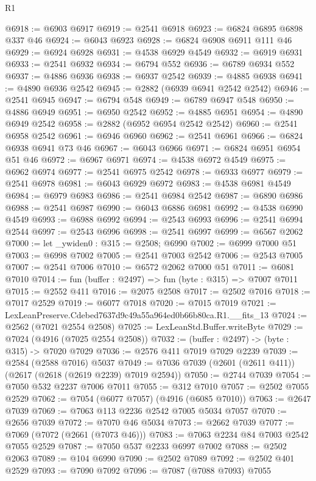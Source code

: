 \begin{lexlean}{R1}
\begin{coremodule}
@6918 := @6903 @6917
@6919 := @2541 @6918
@6923 := @6824 @6895 @6898 @337 @46
@6924 := @6043 @6923
@6928 := @6824 @6908 @6911 @111 @46
@6929 := @6924 @6928
@6931 := @4538 @6929 @4549
@6932 := @6919 @6931
@6933 := @2541 @6932
@6934 := @6794 @552
@6936 := @6789 @6934 @552
@6937 := @4886 @6936
@6938 := @6937 @2542
@6939 := @4885 @6938
@6941 := @4890 @6936 @2542
@6945 := @2882 (@6939 @6941 @2542 @2542)
@6946 := @2541 @6945
@6947 := @6794 @548
@6949 := @6789 @6947 @548
@6950 := @4886 @6949
@6951 := @6950 @2542
@6952 := @4885 @6951
@6954 := @4890 @6949 @2542
@6958 := @2882 (@6952 @6954 @2542 @2542)
@6960 := @2541 @6958 @2542
@6961 := @6946 @6960
@6962 := @2541 @6961
@6966 := @6824 @6938 @6941 @73 @46
@6967 := @6043 @6966
@6971 := @6824 @6951 @6954 @51 @46
@6972 := @6967 @6971
@6974 := @4538 @6972 @4549
@6975 := @6962 @6974
@6977 := @2541 @6975 @2542
@6978 := @6933 @6977
@6979 := @2541 @6978
@6981 := @6043 @6929 @6972
@6983 := @4538 @6981 @4549
@6984 := @6979 @6983
@6986 := @2541 @6984 @2542
@6987 := @6890 @6986
@6988 := @2541 @6987
@6990 := @6043 @6886 @6981
@6992 := @4538 @6990 @4549
@6993 := @6988 @6992
@6994 := @2543 @6993
@6996 := @2541 @6994 @2544
@6997 := @2543 @6996
@6998 := @2541 @6997
@6999 := @6567 @2062
@7000 := let _ywiden0 : @315 := @2508; @6990
@7002 := @6999 @7000 @51
@7003 := @6998 @7002
@7005 := @2541 @7003 @2542
@7006 := @2543 @7005
@7007 := @2541 @7006
@7010 := @6572 @2062 @7000 @51
@7011 := @6081 @7010
@7014 := fun (buffer : @2497) => fun (byte : @315) => @7007 @7011
@7015 := @2552 @411
@7016 := @2075 @2508
@7017 := @2502 @7016
@7018 := @7017 @2529
@7019 := @6077 @7018
@7020 := @7015 @7019
@7021 := LexLeanPreserve.Cdebed7637d9c49a55a964ed0b66b80ca.R1.__fits_13
@7024 := @2562 (@7021 @2554 @2508)
@7025 := LexLeanStd.Buffer.writeByte
@7029 := @7024 (@4916 (@7025 @2554 @2508))
@7032 := (buffer : @2497) -> (byte : @315) -> @7020 @7029
@7036 := @2576 @411 @7019 @7029 @2239
@7039 := @2584 (@2588 @7016) @5037
@7049 := @7036 @7039 (@2601 (@2611 @411)) (@2617 (@2618 (@2619 @2239) @7019 @2594))
@7050 := @2744 @7039
@7054 := @7050 @532 @2237 @7006 @7011
@7055 := @312 @7010
@7057 := @2502 @7055 @2529
@7062 := @7054 (@6077 @7057) (@4916 (@6085 @7010))
@7063 := @2647 @7039
@7069 := @7063 @113 @2236 @2542 @7005 @5034 @7057
@7070 := @2656 @7039
@7072 := @7070 @46 @5034
@7073 := @2662 @7039
@7077 := @7069 (@7072 (@2661 (@7073 @46)))
@7083 := @7063 @2234 @84 @7003 @2542 @7055 @2529
@7087 := @7050 @537 @2233 @6997 @7002
@7088 := @2502 @2063
@7089 := @104 @6990
@7090 := @2502 @7089
@7092 := @2502 @401 @2529
@7093 := @7090 @7092
@7096 := @7087 (@7088 @7093) @7055

\end{coremodule}
\end{lexlean}
